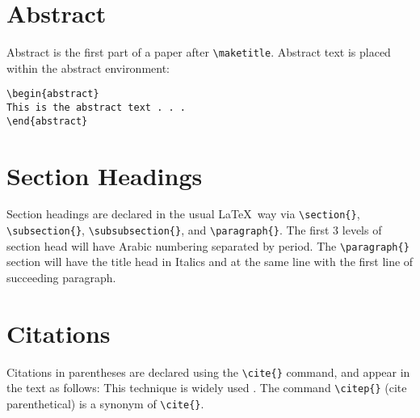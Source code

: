 \documentclass{clv3}
\begin{document}
\section{Abstract}

Abstract is the first part of a paper after \verb|\maketitle|. Abstract text is
placed within the abstract environment:

\begin{verbatim}
\begin{abstract}
This is the abstract text . . .
\end{abstract}
\end{verbatim}

\section{Section Headings}

Section headings are declared in the usual \LaTeX\ way via \verb|\section{}|,
\verb|\subsection{}|, \verb|\subsubsection{}|, and \verb|\paragraph{}|. The
first 3 levels of section head will have Arabic numbering separated
by period. The \verb|\paragraph{}| section will have the title head in Italics
and at the same line with the first line of succeeding paragraph.

\section{Citations}
Citations in parentheses are declared using the \verb|\cite{}|
command, and appear in the text as follows:
This technique is widely used \cite{woods}.
The command \verb|\citep{}| (cite parenthetical) is a synonym of \verb|\cite{}|.
\end{document}
